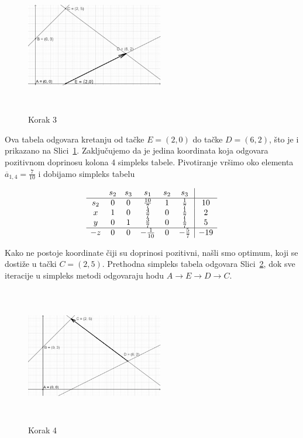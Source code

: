 \documentclass[a4paper, utf8, 11pt, colorlinks]{book}
\theoremstyle{definition}
\begin{document}
\begin{figure}[H]
	\centering
	\includegraphics[width=170pt, height=170pt]{simpleks-primjer-2-sl3.eps}
	\caption{Korak 3}
	\label{fig:step-3}
\end{figure}

Ova tabela odgovara kretanju od tačke $E=(2,0)$ do tačke $D=(6,2)$, što je i prikazano na Slici~\ref{fig:step-3}.
Zaključujemo da je jedina koordinata koja odgovara pozitivnom doprinosu kolona 
4 simpleks tabele. Pivotiranje vršimo oko elementa $\overline{a}_{1,4} = \frac{7}{10}$ i  dobijamo simpleks tabelu 

$$\begin{array}{cccccc| c}
	& s_2  & s_3   & s_1  & s_2 & s_3 &     \\ \hline
s_2 &  0   &  0    & \frac{10}{7}    &  1   & \frac{1}{7}   & 10 \\
x   &  1   &  0    &  \frac{4}{7}    &  0   & \frac{1}{7}  & 2 \\
y   &  0   &  1    &  \frac{3}{7}    &  0   & \frac{1}{7}   & 5  \\ \hline
-z  &  0   &  0   &   -\frac{1}{10}  & 0    &  -\frac{5}{7} & -19 \\
\end{array}
$$ 

Kako ne postoje koordinate čiji su doprinosi pozitivni, našli smo optimum, koji se dostiže u tački $C=(2,5)$. Prethodna simpleks tabela odgovara Slici~\ref{fig:step-4}, dok sve iteracije u simpleks metodi odgovaraju 
hodu $A \rightarrow E \rightarrow D \rightarrow C$. 

\begin{figure}[H]
	\centering
	\includegraphics[width=170pt, height=170pt]{simpleks-primjer-2-sl4.eps}
	\caption{Korak 4}
	\label{fig:step-4}
\end{figure}
\end{document}
